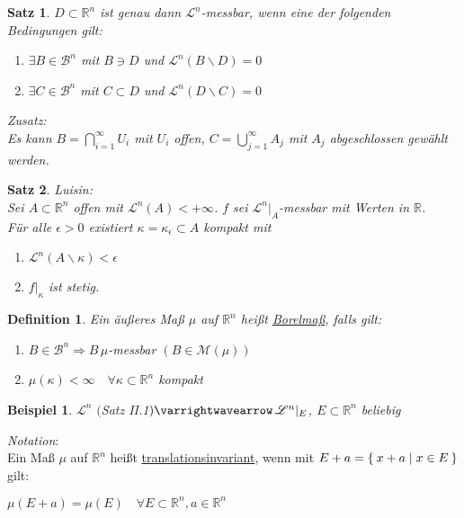 \documentclass[11pt]{memoir}
\theoremstyle{changebreak}
\newtheorem{Definition}{Definition}[chapter]
\newtheorem{Beispiel}{Beispiel}[chapter]
\newtheorem{Satz}{Satz}[chapter]
\begin{document}
\begin{Satz}
	$D \subset \mathbb{R}^n$ ist genau dann $\mathscr{L}^n$-messbar, wenn eine der folgenden Bedingungen gilt:
	\begin{enumerate}
		\item $\exists B \in \mathscr{B}^n$ mit $B \ni D$ und $\mathscr{L}^n(B \backslash D) = 0$
		\item $\exists C \in \mathscr{B}^n$ mit $C \subset D$ und $\mathscr{L}^n(D \backslash C) = 0$
	\end{enumerate}
	\textit{Zusatz:}\\
	Es kann $B = \bigcap\limits_{i = 1}^\infty U_i$ mit $U_i$ offen, $C = \bigcup\limits_{j = 1}^\infty A_j$ mit $A_j$
	abgeschlossen gewählt werden.
\end{Satz}

\begin{Satz}
\emph{Luisin}: \\
Sei $A \subset \mathbb R^n$ offen mit $\mathscr L^n(A) < + \infty$. $f$ sei $\mathscr L^n\vert_A$-messbar mit Werten in $\mathbb R$. \\
Für alle $\epsilon > 0$ existiert $\kappa = \kappa_\epsilon \subset A$ kompakt mit
\begin{enumerate}
	\item $\mathscr L^n(A \backslash \kappa) < \epsilon$
	\item $f|_\kappa$ ist stetig.
\end{enumerate}
\end{Satz}



\begin{Definition}
Ein äußeres Maß $\mu$ auf $\mathbb R^n$ heißt \underline{Borelmaß}, falls gilt:
\begin{enumerate}
	\item $B \in \mathscr B^n \Rightarrow B \, \mu$-messbar $(B \in \mathscr M(\mu))$
	\item $\mu(\kappa) < \infty \quad \forall \kappa \subset \mathbb R^n$ kompakt
\end{enumerate}
\end{Definition}

\begin{Beispiel}
$\mathscr L^n$ $($Satz II.1$) \varrightwavearrow \, \mathscr L^n|_E$, $E \subset \mathbb R^n$ beliebig
\end{Beispiel}

\emph{Notation}: \\
Ein Maß $\mu$ auf $\mathbb R^n$ heißt \underline{translationsinvariant}, wenn mit $E + a = \Set{x +a | x \in E}$ gilt:
\begin{center}
	$\mu(E+a) = \mu(E) \quad \forall E \subset \mathbb R^n, a \in \mathbb R^n$
\end{center}
\end{document}
